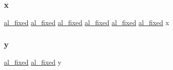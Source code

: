 \subsubsection{\texorpdfstring{x}{x}}
{\footnotesize\ttfamily \hyperlink{fixed_8h_acaad2e927f969d9882d1e1e80ac1c5e2}{al\+\_\+fixed} \hyperlink{fixed_8h_acaad2e927f969d9882d1e1e80ac1c5e2}{al\+\_\+fixed} \hyperlink{fixed_8h_acaad2e927f969d9882d1e1e80ac1c5e2}{al\+\_\+fixed} \hyperlink{fixed_8h_acaad2e927f969d9882d1e1e80ac1c5e2}{al\+\_\+fixed} \hyperlink{fixed_8h_acaad2e927f969d9882d1e1e80ac1c5e2}{al\+\_\+fixed} \hyperlink{fixed_8h_acaad2e927f969d9882d1e1e80ac1c5e2}{al\+\_\+fixed} x}

\mbox{\label{fmaths_8inl_ad01ab75ae50a1a624185bfa014c66cfa}} 
\subsubsection{\texorpdfstring{y}{y}}
{\footnotesize\ttfamily \hyperlink{fixed_8h_acaad2e927f969d9882d1e1e80ac1c5e2}{al\+\_\+fixed} \hyperlink{fixed_8h_acaad2e927f969d9882d1e1e80ac1c5e2}{al\+\_\+fixed} y}

